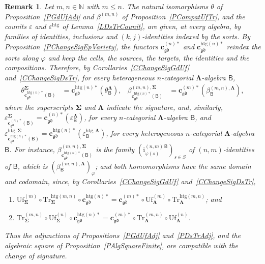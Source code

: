 \documentclass[a4paper, reqno]{amsbook}
\newcommand{\sig}[1]{\mathbf{#1}}             %
\newcommand{\calg}[1]{\boldsymbol{\mathsf{#1}}} %
\newcommand{\gd}{\mathfrak{gd}}              %
\newcommand{\htg}{\mathrm{htg}}                %
\newcommand{\Uf}{\mathrm{Uf}}
\newcommand{\Tr}{\mathrm{Tr}}
\theoremstyle{plain}
\newtheorem{remark}[theorem]{Remark}
\theoremstyle{definition}
\begin{document}
\begin{remark}\label{RChangeSigNat}
Let $m,n\in\mathbb{N}$ with $m\leq n$.
The natural isomorphisms $\theta$ of Proposition~\ref{PGdUfAdj} and $\beta^{(m,n)}$ of Proposition~\ref{PCompatUfTr}, and the counits $\varepsilon$ and $\varepsilon^{\htg}$ of Lemma~\ref{LDsTrCounit}, are given, at every algebra, by families of identities, inclusions and $(k,j)$-identities indexed by the sorts.
By Proposition~\ref{PChangeSigEpVariety}, the functors $\mathbf{c}^{(n)\ast}_{\gd}$ and $\mathbf{c}^{\htg(n)\ast}_{\gd}$ reindex the sorts along $\varphi$ and keep the cells, the sources, the targets, the identities and the compositions.
Therefore, by Corollaries~\ref{CChangeSigGdUf} and~\ref{CChangeSigDsTr}, for every heterogeneous $n$-categorial $\sig{\Lambda}$-algebra $\calg{B}$,
\begin{align*}
\theta^{\sig{\Sigma}}_{\mathbf{c}^{\htg(n)\ast}_{\gd}(\calg{B})}&=\mathbf{c}^{\htg(n)\ast}_{\gd}\left(\theta^{\sig{\Lambda}}_{\calg{B}}\right),
&
\beta^{(m,n),\sig{\Sigma}}_{\mathbf{c}^{\htg(n)\ast}_{\gd}(\calg{B})}&=\mathbf{c}^{(m)\ast}_{\gd}\left(\beta^{(m,n),\sig{\Lambda}}_{\calg{B}}\right),
\end{align*}
where the superscripts $\sig{\Sigma}$ and $\sig{\Lambda}$ indicate the signature, and, similarly, $\varepsilon^{\sig{\Sigma}}_{\mathbf{c}^{(n)\ast}_{\gd}(\calg{B})}=\mathbf{c}^{(n)\ast}_{\gd}(\varepsilon^{\sig{\Lambda}}_{\calg{B}})$, for every $n$-categorial $\sig{\Lambda}$-algebra $\calg{B}$, and $\varepsilon^{\htg,\sig{\Sigma}}_{\mathbf{c}^{\htg(n)\ast}_{\gd}(\calg{B})}=\mathbf{c}^{\htg(n)\ast}_{\gd}(\varepsilon^{\htg,\sig{\Lambda}}_{\calg{B}})$, for every heterogeneous $n$-categorial $\sig{\Lambda}$-algebra $\calg{B}$.
For instance, $\beta^{(m,n),\sig{\Sigma}}_{\mathbf{c}^{\htg(n)\ast}_{\gd}(\calg{B})}$ is the family $(\mathrm{i}^{(n,m)\,\calg{B}}_{\varphi(s)})_{s\in S}$ of $(n,m)$-identities of $\calg{B}$, which is $(\beta^{(m,n),\sig{\Lambda}}_{\calg{B}})_{\varphi}$; and both homomorphisms have the same domain and codomain, since, by Corollaries~\ref{CChangeSigGdUf} and~\ref{CChangeSigDsTr},
\begin{enumerate}
	\item
	$ \Uf^{(m)}_{\sig{\Sigma}}\circ\Tr^{\htg(m,n)}_{\sig{\Sigma}}\circ\mathbf{c}^{\htg(n)\ast}_{\gd}=\mathbf{c}^{(m)\ast}_{\gd}\circ\Uf^{(m)}_{\sig{\Lambda}}\circ\Tr^{\htg(m,n)}_{\sig{\Lambda}} $; and

	\item
	$ \Tr^{(m,n)}_{\sig{\Sigma}}\circ\Uf^{(n)}_{\sig{\Sigma}}\circ\mathbf{c}^{\htg(n)\ast}_{\gd}=\mathbf{c}^{(m)\ast}_{\gd}\circ\Tr^{(m,n)}_{\sig{\Lambda}}\circ\Uf^{(n)}_{\sig{\Lambda}} $.
\end{enumerate}
Thus the adjunctions of Propositions~\ref{PGdUfAdj} and~\ref{PDsTrAdj}, and the algebraic square of Proposition~\ref{PAlgSquareFinite}, are compatible with the change of signature.
\end{remark}
\end{document}
